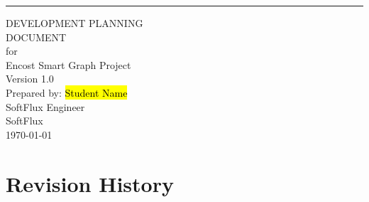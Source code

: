 \documentclass{scrreprt}
\date{}
\def\myversion{1.0 }
\begin{document}
\begin{flushright}
    \rule{16cm}{5pt}\vskip1cm
    \begin{bfseries}
        \Huge{DEVELOPMENT PLANNING \\DOCUMENT}\\
        \vspace{1.5cm}
        for\\
        \vspace{1.5cm}
        Encost Smart Graph Project\\
        \vspace{1.5cm}
        \LARGE{Version \myversion}\\
        \vspace{1.5cm}
        Prepared by: \hl{Student Name}\\
        SoftFlux Engineer \\
        \vspace{1.5cm}
        SoftFlux \\
        \vspace{1.5cm}
        \today\\
    \end{bfseries}
\end{flushright}

\tableofcontents

\newpage

\chapter*{Revision History}
\end{document}
